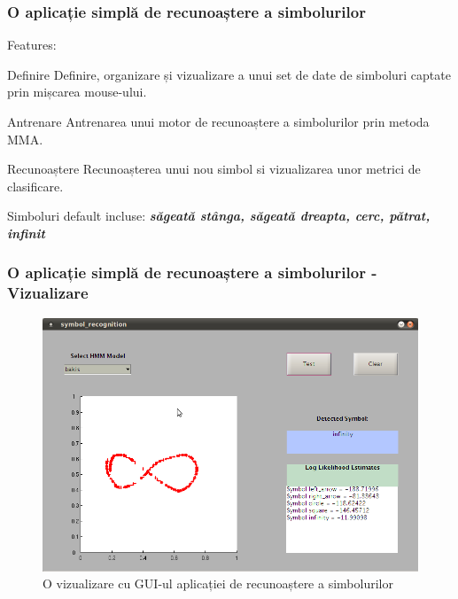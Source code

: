 \begin{frame}[t]
	\frametitle{O aplicație simplă de recunoaștere a simbolurilor}
	Features:
	\pause
	\begin{block}{Definire}
		Definire, organizare și vizualizare a unui set de date de simboluri captate prin mișcarea mouse-ului.
	\end{block}
	\pause
	
	\begin{block}{Antrenare}
		Antrenarea unui motor de recunoaștere a simbolurilor prin metoda MMA.
	\end{block}
	\pause
	
	\begin{block}{Recunoaștere}
		Recunoașterea unui nou simbol si vizualizarea unor metrici de clasificare.
	\end{block}
	\pause
	
	\begin{block}{}
		Simboluri default incluse: \textbf{\emph{săgeată stânga, săgeată dreapta, cerc, pătrat, infinit}}
	\end{block}
\end{frame}

\begin{frame}[t]
	\frametitle{O aplicație simplă de recunoaștere a simbolurilor - Vizualizare}	
	
	\begin{figure}
  		\centering
		\includegraphics[height=0.70\textheight]{graphics/demo-app/infinity.png}
		\caption{\tiny{O vizualizare cu GUI-ul aplicației de recunoaștere a simbolurilor}}
		\label{fig:baum-welch-alg}
  	\end{figure}	
\end{frame}

